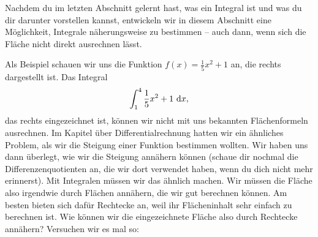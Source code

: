 \documentclass[../../main.tex]{subfiles}
\begin{document}
Nachdem du im letzten Abschnitt gelernt hast, was ein Integral ist und was du dir darunter vorstellen kannst,
entwickeln wir in diesem Abschnitt eine Möglichkeit, Integrale näherungsweise zu bestimmen -- auch dann, wenn sich
die Fläche nicht direkt ausrechnen lässt.

Als Beispiel schauen wir uns die Funktion $f(x)=\frac{1}{5}x^2+1$ an, die rechts dargestellt ist. Das Integral
\[\int_1^4\frac{1}{5}x^2+1\mathop{}\mathrm{d} x,\]
das rechts eingezeichnet ist, können wir nicht mit uns bekannten Flächenformeln ausrechnen. Im Kapitel über 
Differentialrechnung hatten wir ein ähnliches Problem, als wir die Steigung einer Funktion bestimmen wollten. Wir haben
uns dann überlegt, wie wir die Steigung annähern können (schaue dir nochmal die Differenzenquotienten an, die wir dort
verwendet haben, wenn du dich nicht mehr erinnerst). Mit Integralen müssen wir das ähnlich machen. Wir müssen die
Fläche also irgendwie durch Flächen annähern, die wir gut berechnen können. Am besten bieten sich dafür Rechtecke an,
weil ihr Flächeninhalt sehr einfach zu berechnen ist. Wie können wir die eingezeichnete Fläche also durch Rechtecke 
annähern? Versuchen wir es mal so:
\end{document}
